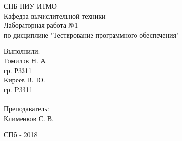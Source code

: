 \begin{center}
СПБ НИУ ИТМО\\
\vspace{1cm}
Кафедра вычислительной техники\\
\vspace{5.5cm}
\huge{Лабораторная работа №1}\\
\vspace{0.3cm}
\large{по дисциплине
"Тестирование программного обеспечения"\\}
\vspace{1.7cm}


\end{center}
\vspace{6.5cm}
\begin{adjustwidth*}{13.5cm}{-1.5cm}
Выполнили:\\
Томилов Н. А.\\
гр. Р3311\\
Киреев В. Ю.\\
гр. P3311\\
\\
Преподаватель:\\
Клименков С. В.\\
\end{adjustwidth*}

\vspace{4.5cm}
\begin{center}
СПб - 2018
\end{center}
